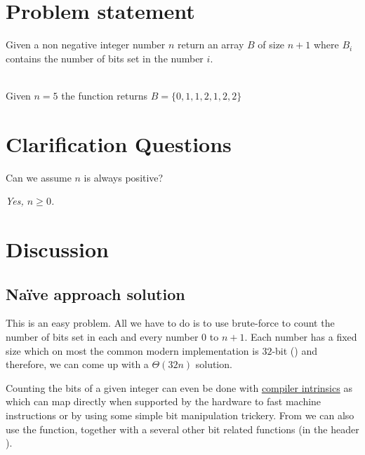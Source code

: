 \section{Problem statement}
\begin{exercise}
\label{example:count_bits:exercice1}
Given a non negative integer number $n$ return an array $B$ of size $n+1$ where $B_i$ contains the
number of bits set in the number $i$.
	\begin{example}
		\label{example:count_bits:example1}
		\hfill \\
		Given $n = 5$ the function returns $B = \{0,1,1,2,1,2,2\}$	
	\end{example}

\end{exercise}

\section{Clarification Questions}

\begin{QandA}
	\item \begin{questionitem} \begin{question} Can we assume $n$ is always positive?  \end{question} 	 
    \begin{answered}
		\textit{Yes, $n \geq 0$.}
	\end{answered} \end{questionitem}
	
\end{QandA}

\section*{Discussion}
\label{count_bits:sec:discussion}


\subsection{Na\"ive approach solution}
\label{count_bits:sec:bruteforce}
This is an easy problem. All we have to do is to use brute-force to count the number of bits set in each and every number $0$ to $n+1$. 
Each number has a fixed size which on most the common modern \CC implementation is $32$-bit () and therefore,
we can come up with a $\Theta(32n)$ solution. 

Counting the bits of a given integer can even be done
with
\href{https://gcc.gnu.org/onlinedocs/gcc-4.9.2/gcc/X86-Built-in-Functions.html}{compiler intrinsics}
as  which can map directly when supported by the hardware to fast
machine instructions or by using some simple bit manipulation trickery. 
From  we can also use
the  function, together with a several other  bit related functions (in the
header ). 

